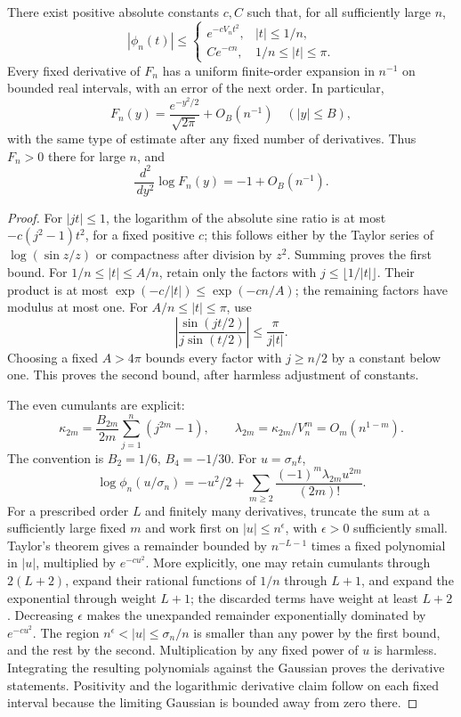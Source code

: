 \documentclass[11pt]{article}
\newcommand{\V}{V_n}\newcommand{\T}{T_{n,r}}\newcommand{\Z}{\mathbb Z}\newcommand{\E}{\mathbb E}\newcommand{\dd}{\,d}
\begin{document}
\begin{lemma}\label{mgp:lem:fourier}
There exist positive absolute constants $c,C$ such that, for all sufficiently large $n$,
\[
 |\phi_n(t)|\le
 \begin{cases}
 e^{-c\V t^2},& |t|\le1/n,\\
 Ce^{-cn},&1/n\le|t|\le\pi.
 \end{cases}
\]
Every fixed derivative of $F_n$ has a uniform finite-order expansion in $n^{-1}$ on bounded real intervals, with an error of the next order. In particular,
\[
 F_n(y)=\frac{e^{-y^2/2}}{\sqrt{2\pi}}+O_B(n^{-1})
 \quad (|y|\le B),
\]
with the same type of estimate after any fixed number of derivatives. Thus $F_n>0$ there for large $n$, and
\[
 \frac{\dd^2}{\dd y^2}\log F_n(y)=-1+O_B(n^{-1}).\label{mgp:eq:curv}
\]
\end{lemma}
\begin{proof}
For $|jt|\le1$, the logarithm of the absolute sine ratio is at most $-c(j^2-1)t^2$, for a fixed positive $c$; this follows either by the Taylor series of $\log(\sin z/z)$ or compactness after division by $z^2$. Summing proves the first bound. For $1/n\le|t|\le A/n$, retain only the factors with $j\le\lfloor1/|t|\rfloor$. Their product is at most $\exp(-c/|t|)\le\exp(-cn/A)$; the remaining factors have modulus at most one. For $A/n\le|t|\le\pi$, use
\[
 \left|\frac{\sin(jt/2)}{j\sin(t/2)}\right|
 \le\frac{\pi}{j|t|}.
\]
Choosing a fixed $A>4\pi$ bounds every factor with $j\ge n/2$ by a constant below one. This proves the second bound, after harmless adjustment of constants.

The even cumulants are explicit:
\begin{equation}\label{mgp:eq:cumulants}
 \kappa_{2m}=\frac{B_{2m}}{2m}\sum_{j=1}^n(j^{2m}-1),\qquad
 \lambda_{2m}=\kappa_{2m}/\V^m=O_m(n^{1-m}).
\end{equation}
The convention is $B_2=1/6$, $B_4=-1/30$. For $u=\sigma_n t$,
\[
 \log\phi_n(u/\sigma_n)=-u^2/2+
 \sum_{m\ge2}\frac{(-1)^m\lambda_{2m}u^{2m}}{(2m)!}.
\]
For a prescribed order $L$ and finitely many derivatives, truncate the sum at a sufficiently large fixed $m$ and work first on $|u|\le n^\epsilon$, with $\epsilon>0$ sufficiently small. Taylor's theorem gives a remainder bounded by $n^{-L-1}$ times a fixed polynomial in $|u|$, multiplied by $e^{-c u^2}$. More explicitly, one may retain cumulants through $2(L+2)$, expand their rational functions of $1/n$ through $L+1$, and expand the exponential through weight $L+1$; the discarded terms have weight at least $L+2$. Decreasing $\epsilon$ makes the unexpanded remainder exponentially dominated by $e^{-c u^2}$. The region $n^\epsilon<|u|\le\sigma_n/n$ is smaller than any power by the first bound, and the rest by the second. Multiplication by any fixed power of $u$ is harmless. Integrating the resulting polynomials against the Gaussian proves the derivative statements. Positivity and the logarithmic derivative claim follow on each fixed interval because the limiting Gaussian is bounded away from zero there.
\end{proof}
\end{document}
